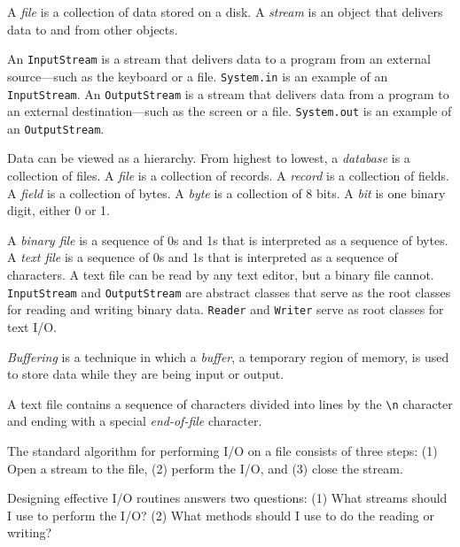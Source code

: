 \begin{SMBLlarge}
\item  A {\it file} is a collection of data stored on a disk.
A {\it stream} is an object that delivers data to and from other
objects.  

\item An {\tt InputStream} is a stream that delivers data to a
program from an external source---such as the keyboard or a file.
{\tt System.in} is an example of an {\tt InputStream}. An
{\tt OutputStream} is a stream that delivers data from a program to an
external destination---such as the screen or a file.   {\tt System.out} is
an example of an {\tt OutputStream}.

\item  Data can be viewed as a hierarchy.  From highest to
lowest, a {\it database} is a collection of files.  A {\it file} is a
collection of records.  A {\it record} is a collection of fields.   A
{\it field} is a collection of bytes.  A {\it byte} is a collection of
8 bits.   A {\it bit} is one binary digit, either 0 or 1.

\item  A {\it binary file} is a sequence of 0s and 1s that
is interpreted as a sequence of bytes.  A {\it text file} is a sequence
of 0s and 1s that is interpreted as a sequence of characters.  A text
file can be read by any text editor, but a binary file cannot.
{\tt InputStream} and {\tt OutputStream} are abstract classes that
serve as the root classes for reading and writing binary data.   {\tt Reader}
and {\tt Writer} serve as root classes for text I/O.

\item  {\it Buffering} is a technique in which a {\it buffer}, a temporary
region of memory, is used to store data while they are being input or
output.

\item  A text file contains a sequence of characters divided into
lines by the \verb|\n| character and ending with a special
{\it end-of-file} character.

\item  The standard algorithm for performing I/O on a file consists
of three steps: (1) Open a stream to the file, (2) perform the
I/O, and (3) close the stream.


\item  Designing effective I/O routines answers
two questions: (1) What streams should I use to perform
the I/O? (2) What methods should I use to do the reading
or writing?


\end{SMBLlarge}
